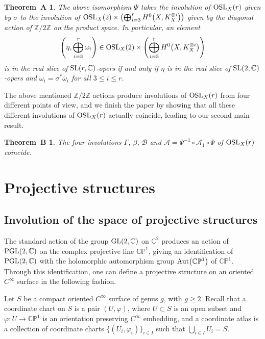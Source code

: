 \documentclass[pdftex]{sigma}
\numberwithin{equation}{section}
\newtheorem*{TheoremA}{Theorem~A}
\newtheorem*{TheoremB}{Theorem~B}
\begin{document}
\begin{TheoremA}
The above isomorphism $\Psi$ takes the involution of ${\rm OSL}_X(r)$ given by $\sigma$ to the
involution of ${\rm OSL}_X(2)\times \bigl(\bigoplus_{i=3}^r H^0\bigl(X, K^{\otimes i}_X\bigr)\bigr)$ given by the diagonal action of
${\mathbb Z}/2\mathbb Z$ on the product space. In particular, an element
\[
\left(\eta, \bigoplus_{i=3}^r \omega_i\right) \in
{\rm OSL}_X(2)\times \left(\bigoplus_{i=3}^r H^0\bigl(X, K^{\otimes i}_X\bigr)\right)
\]
is in the real slice of ${\rm SL}(r,{\mathbb C})$-opers
if and only if $\eta$ is in the real slice of ${\rm SL}(2,{\mathbb C})$-opers and
$\omega_i = \sigma^*\overline{\omega}_i$ for all $3 \leq i \leq r$.
\end{TheoremA}

The above mentioned ${\mathbb Z}/2\mathbb Z$ actions produce involutions of ${\rm OSL}_X(r)$
from four different points of view, and we finish the paper by showing that all these different involutions of
${\rm OSL}_X(r)$ actually coincide, leading to our second main result.

\begin{TheoremB}
The four involutions $\Gamma$, $\beta$, $\mathcal B$ and $\mathcal A=\Psi^{-1}\circ\mathcal A_1\circ\Psi$ of
${\rm OSL}_X(r)$ coincide.
\end{TheoremB}

\section{Projective structures}

\subsection{Involution of the space of projective structures}

The standard action of the group ${\rm GL}(2,{\mathbb C})$ on ${\mathbb C}^2$ produces an action of
${\rm PGL}(2,{\mathbb C})$ on the complex projective line ${\mathbb C}{\mathbb P}^1$, giving
an identification of ${\rm PGL}(2,{\mathbb C})$ with the holomorphic automorphism group ${\rm Aut}
\bigl({\mathbb C}{\mathbb P}^1\bigr)$ of ${\mathbb C}{\mathbb P}^1$. Through this identification, one can define
a projective structure on an oriented $C^\infty$ surface in the following fashion.

Let $S$ be a compact oriented $C^\infty$ surface of genus $g$, with $g \geq 2$.
Recall that a
coordinate chart on $S$ is a pair $(U, \varphi)$, where $U \subset S$ is an open
subset and $\varphi\colon U \longrightarrow {\mathbb C}{\mathbb P}^1$ is an orientation
preserving $C^\infty$ embedding, and a coordinate atlas is a collection of coordinate charts $\{(U_i,
\varphi_i)\}_{i\in I}$ such that $\bigcup_{i\in I} U_i = S$.
\end{document}
